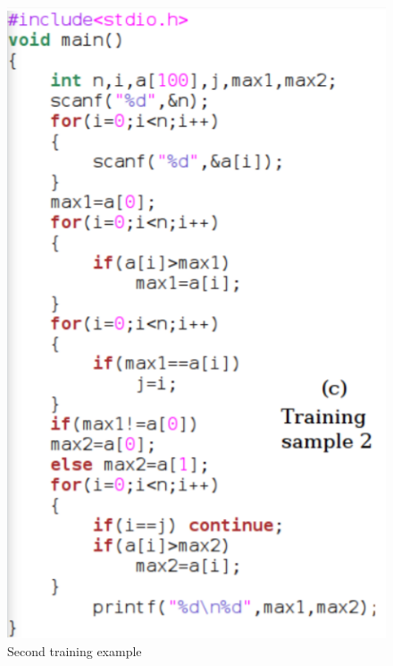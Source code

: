 \documentclass[conference, onecolumn, a4, 12pt]{IEEEtran}
\begin{document}
\begin{figure}
	\centering
	\includegraphics[width=0.7\linewidth]{Second_training_sample}
	\caption{Second training example}
	\label{fig:secondtrainingsample}
\end{figure}
\end{document}
